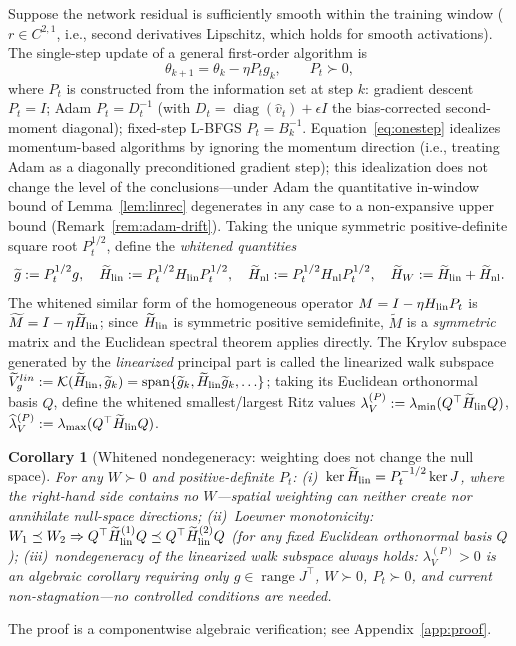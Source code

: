 \documentclass[11pt]{article}
\newcommand{\W}{W}
\newcommand{\wt}[1]{\widetilde{#1}}
\DeclareMathOperator{\diag}{diag}
\DeclareMathOperator{\spanop}{span}
\newtheorem{corollary}{Corollary}[section]
\numberwithin{equation}{section}
\begin{document}
Suppose the network residual is sufficiently smooth within the training window ($r\in C^{2,1}$, i.e., second derivatives Lipschitz, which holds for smooth activations). The single-step update of a general first-order algorithm is
\begin{equation}\label{eq:onestep}
\theta_{k+1}=\theta_k-\eta P_t g_k,\qquad P_t\succ0,
\end{equation}
where $P_t$ is constructed from the information set at step $k$: gradient descent $P_t=I$; Adam $P_t=D_t^{-1}$ (with $D_t=\diag(\hat v_t)+\epsilon I$ the bias-corrected second-moment diagonal); fixed-step L-BFGS $P_t=B_k^{-1}$. Equation~\eqref{eq:onestep} idealizes momentum-based algorithms by ignoring the momentum direction (i.e., treating Adam as a diagonally preconditioned gradient step); this idealization does not change the level of the conclusions---under Adam the quantitative in-window bound of Lemma~\ref{lem:linrec} degenerates in any case to a non-expansive upper bound (Remark~\ref{rem:adam-drift}). Taking the unique symmetric positive-definite square root $P_t^{1/2}$, define the \emph{whitened quantities}
\begin{align}
\wt g:=P_t^{1/2}g,\quad \wt H_{\rm lin}:=P_t^{1/2}H_{\rm lin}P_t^{1/2},\quad
\wt H_{\rm nl}:=P_t^{1/2}H_{\rm nl}P_t^{1/2},\quad \wt H_{\W}:=\wt H_{\rm lin}+\wt H_{\rm nl}.\label{eq:white}
\end{align}
The whitened similar form of the homogeneous operator $M=I-\eta H_{\rm lin}P_t$ is $\wt M=I-\eta\wt H_{\rm lin}$; since $\wt H_{\rm lin}$ is symmetric positive semidefinite, $\wt M$ is a \emph{symmetric} matrix and the Euclidean spectral theorem applies directly. The Krylov subspace generated by the \emph{linearized} principal part is called the linearized walk subspace $\wt V_g^{lin}:=\mathcal K(\wt H_{\rm lin},\wt g_k)=\spanop\{\wt g_k,\wt H_{\rm lin}\wt g_k,\ldots\}$; taking its Euclidean orthonormal basis $Q$, define the whitened smallest/largest Ritz values $\lambda_V^{(P)}:=\lambda_{\min}(Q^\top\wt H_{\rm lin}Q)$, $\widehat\lambda_V^{(P)}:=\lambda_{\max}(Q^\top\wt H_{\rm lin}Q)$.

\begin{corollary}[Whitened nondegeneracy: weighting does not change the null space]\label{cor:ker}
For any $\W\succ0$ and positive-definite $P_t$: (i)~$\ker\wt H_{\rm lin}=P_t^{-1/2}\ker J$, where the right-hand side contains no $\W$---spatial weighting can neither create nor annihilate null-space directions; (ii)~Loewner monotonicity: $\W_1\preceq\W_2\Rightarrow Q^\top\wt H_{\rm lin}^{(1)}Q\preceq Q^\top\wt H_{\rm lin}^{(2)}Q$ (for any fixed Euclidean orthonormal basis $Q$); (iii)~nondegeneracy of the linearized walk subspace always holds: $\lambda_V^{(P)}>0$ is an algebraic corollary requiring only $g\in\operatorname{range}J^\top$, $\W\succ0$, $P_t\succ0$, and current non-stagnation---\emph{no} controlled conditions are needed.
\end{corollary}
The proof is a componentwise algebraic verification; see Appendix~\ref{app:proof}.
\end{document}
